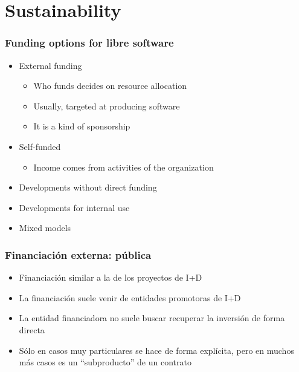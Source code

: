 %

\section{Sustainability}





\begin{frame}
\frametitle{Funding options for libre software}

\begin{itemize}
\item External funding
  \begin{itemize}
    \item Who funds decides on resource allocation
    \item Usually, targeted at producing software
    \item It is a kind of sponsorship
  \end{itemize}
\item Self-funded
  \begin{itemize}
  \item Income comes from activities of the organization
  \end{itemize}
\item Developments without direct funding
\item Developments for internal use
\item Mixed models
\end{itemize}

\end{frame}


\begin{frame}
\frametitle{Financiación externa: pública}

\begin{itemize}
\item Financiación similar a la de los proyectos de I+D
\item La financiación suele venir de entidades promotoras de I+D
\item La entidad financiadora no suele buscar recuperar la inversión
  de forma directa
\item Sólo en casos muy particulares se hace de forma explícita, pero
  en muchos más casos es un ``subproducto'' de un contrato
\end{itemize}

\end{frame}

